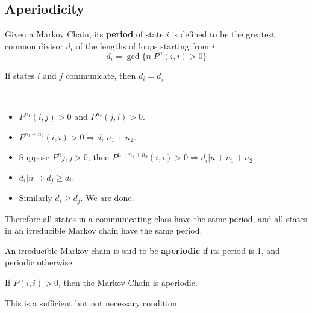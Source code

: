 \subsection{Aperiodicity}
\begin{definition}[Period]
    Given a Markov Chain, its \textbf{period} of state $i$ is defined to be the greatest common divisor $d_i$ of the lengths of loops starting from $i$.
    \[ d_i = \gcd\{n|P^n(i,i) > 0\} \]
\end{definition}
\begin{theorem}
    If states $i$ and $j$ communicate, then $d_i = d_j$
\end{theorem}
\begin{sketchproof}
    ~{}
    \begin{itemize}
        \item $P^{n_1}(i,j) > 0$ and $P^{n_2}(j,i) > 0$.
        \item $P^{n_1+n_2}(i,i)>0 \Rightarrow d_i | n_1 + n_2$.
        \item Suppose $P^n{j,j} > 0$, then $P^{n+n_1+n_2}(i,i) > 0 \Rightarrow d_i | n + n_1 + n_2$.
        \item $d_i | n \Rightarrow d_j \ge d_i$.
        \item Similarly $d_i \ge d_j$. We are done.
    \end{itemize}
\end{sketchproof}
\begin{remark}
    Therefore all states in a communicating class have the same period, and all states in an irreducible Markov chain have the same period.
\end{remark}
\begin{definition}[Aperiodicity]
    An irreducible Markov chain is said to be \textbf{aperiodic} if its period is 1, and periodic otherwise.
\end{definition}
\begin{proposition}
    \normalfont
    If $P(i,i) > 0$, then the Markov Chain is aperiodic.
\end{proposition}
\begin{remark}
    This is a sufficient but not necessary condition.
\end{remark}

